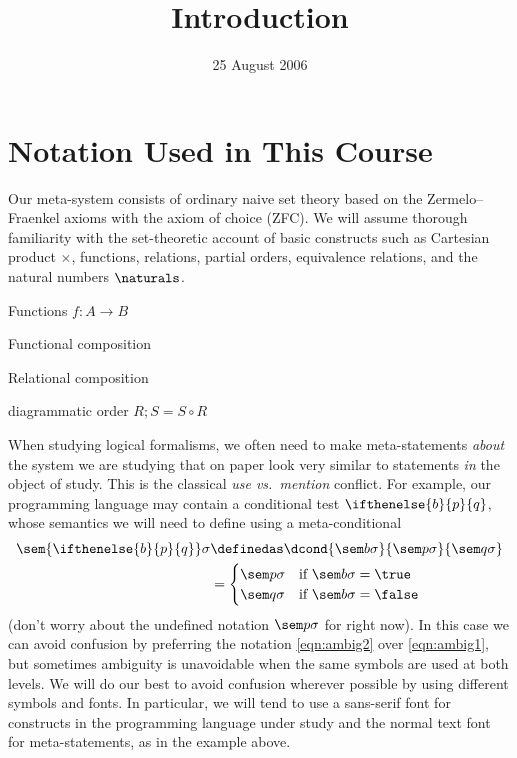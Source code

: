 \title{Introduction}
\date{25 August 2006}
\maketitle

\section{Notation Used in This Course}

Our meta-system consists of ordinary naive set theory based on the Zermelo--Fraenkel axioms with the axiom of choice (ZFC).  We will assume thorough familiarity with the set-theoretic account of basic constructs such as Cartesian product $\times$, functions, relations, partial orders, equivalence relations, and the natural numbers $\naturals$.


Functions $f:A\to B$

Functional composition 

Relational composition

diagrammatic order $R;S = S\circ R$

When studying logical formalisms, we often need to make meta-statements \emph{about} the system we are studying that on paper look very similar to statements \emph{in} the object of study.  This is the classical \emph{use vs.~mention} conflict.  For example, our programming language may contain a conditional test $\ifthenelse{b}{p}{q}$, whose semantics we will need to define using a meta-conditional
\begin{align}
\sem{\ifthenelse{b}{p}{q}}\sigma &\definedas \dcond{\sem b\sigma}{\sem p\sigma}{\sem q\sigma}\label{eqn:ambig1}\\
&= \begin{cases}
\sem p\sigma & \text{if } \sem b\sigma = \true\\
\sem q\sigma & \text{if } \sem b\sigma = \false
\end{cases}\label{eqn:ambig2}
\end{align}
(don't worry about the undefined notation $\sem p\sigma$ for right now).  In this case we can avoid confusion by preferring the notation \eqref{eqn:ambig2} over \eqref{eqn:ambig1}, but sometimes ambiguity is unavoidable when the same symbols are used at both levels.  We will do our best to avoid confusion wherever possible by using different symbols and fonts.  In particular, we will tend to use a \textsf{sans-serif font} for constructs in the programming language under study and the normal text font for meta-statements, as in the example above.

